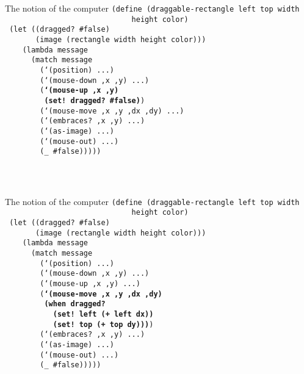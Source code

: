 \begin{frame}{The notion of the computer}
  \small
  \texttt{(define (draggable-rectangle left top width \\
    \ \ \ \ \ \ \ \ \ \ \ \ \ \ \ \ \ \ \ \ \ \ \ \ \ \ \ \ \ height color)\\
    \ (let ((dragged? \#false)\\
  \ \ \ \ \ \ \ (image (rectangle width height color)))\\
  \ \ \ \ (lambda message\\
  \ \ \ \ \ \ (match message\\
  \ \ \ \ \ \ \ \ (`(position) ...)\\
  \ \ \ \ \ \ \ \ (`(mouse-down ,x ,y) ...)\\
  \ \ \ \ \ \ \ \ (\textbf{`(mouse-up ,x ,y) \\
    \ \ \ \ \ \ \ \ \ (set! dragged? \#false)})\\
  \ \ \ \ \ \ \ \ (`(mouse-move ,x ,y ,dx ,dy) ...)\\
  \ \ \ \ \ \ \ \ (`(embraces? ,x ,y) ...)\\
  \ \ \ \ \ \ \ \ (`(as-image) ...)\\
  \ \ \ \ \ \ \ \ (`(mouse-out) ...)\\
  \ \ \ \ \ \ \ \ (\_ \#false)))))\\
  \ \\
  \ \\
  \ 
}
\end{frame}

\begin{frame}{The notion of the computer}
  \small
  \texttt{(define (draggable-rectangle left top width \\
    \ \ \ \ \ \ \ \ \ \ \ \ \ \ \ \ \ \ \ \ \ \ \ \ \ \ \ \ \ height color)\\
    \ (let ((dragged? \#false)\\
  \ \ \ \ \ \ \ (image (rectangle width height color)))\\
  \ \ \ \ (lambda message\\
  \ \ \ \ \ \ (match message\\
  \ \ \ \ \ \ \ \ (`(position) ...)\\
  \ \ \ \ \ \ \ \ (`(mouse-down ,x ,y) ...)\\
  \ \ \ \ \ \ \ \ (`(mouse-up ,x ,y) ...)\\
  \ \ \ \ \ \ \ \ (\textbf{`(mouse-move ,x ,y ,dx ,dy)\\
    \ \ \ \ \ \ \ \ \ (when dragged?\\
    \ \ \ \ \ \ \ \ \ \ \ (set! left (+ left dx)) \\  
    \ \ \ \ \ \ \ \ \ \ \ (set! top (+ top dy)))})\\
  \ \ \ \ \ \ \ \ (`(embraces? ,x ,y) ...)\\
  \ \ \ \ \ \ \ \ (`(as-image) ...)\\
  \ \ \ \ \ \ \ \ (`(mouse-out) ...)\\
  \ \ \ \ \ \ \ \ (\_ \#false)))))\\
  \ 
}
\end{frame}


